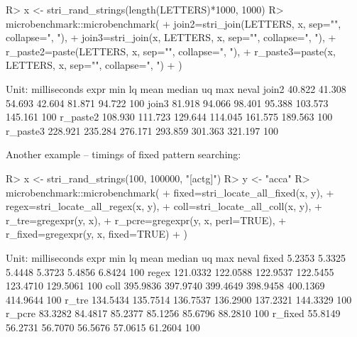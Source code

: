 \documentclass[nojss]{jss}
\begin{document}
\begin{Schunk}
\begin{Sinput}
R> x <- stri_rand_strings(length(LETTERS)*1000, 1000)
R> microbenchmark::microbenchmark(
+      join2=stri_join(LETTERS, x, sep="", collapse=", "),
+      join3=stri_join(x, LETTERS, x, sep="", collapse=", "),
+      r_paste2=paste(LETTERS, x, sep="", collapse=", "),
+      r_paste3=paste(x, LETTERS, x, sep="", collapse=", ")
+  )
\end{Sinput}
\begin{Soutput}
Unit: milliseconds
     expr     min      lq    mean  median      uq     max neval
    join2  40.822  41.308  54.693  42.604  81.871  94.722   100
    join3  81.918  94.066  98.401  95.388 103.573 145.161   100
 r_paste2 108.930 111.723 129.644 114.045 161.575 189.563   100
 r_paste3 228.921 235.284 276.171 293.859 301.363 321.197   100
\end{Soutput}
\end{Schunk}

Another example -- timings of fixed pattern searching:

\begin{Schunk}
\begin{Sinput}
R> x <- stri_rand_strings(100, 100000, "[actg]")
R> y <- "acca"
R> microbenchmark::microbenchmark(
+      fixed=stri_locate_all_fixed(x, y),
+      regex=stri_locate_all_regex(x, y),
+      coll=stri_locate_all_coll(x, y),
+      r_tre=gregexpr(y, x),
+      r_pcre=gregexpr(y, x, perl=TRUE),
+      r_fixed=gregexpr(y, x, fixed=TRUE)
+  )
\end{Sinput}
\begin{Soutput}
Unit: milliseconds
    expr      min       lq     mean   median       uq      max neval
   fixed   5.2353   5.3325   5.4448   5.3723   5.4856   6.8424   100
   regex 121.0332 122.0588 122.9537 122.5455 123.4710 129.5061   100
    coll 395.9836 397.9740 399.4649 398.9458 400.1369 414.9644   100
   r_tre 134.5434 135.7514 136.7537 136.2900 137.2321 144.3329   100
  r_pcre  83.3282  84.4817  85.2377  85.1256  85.6796  88.2810   100
 r_fixed  55.8149  56.2731  56.7070  56.5676  57.0615  61.2604   100
\end{Soutput}
\end{Schunk}



%
%
%
\end{document}
